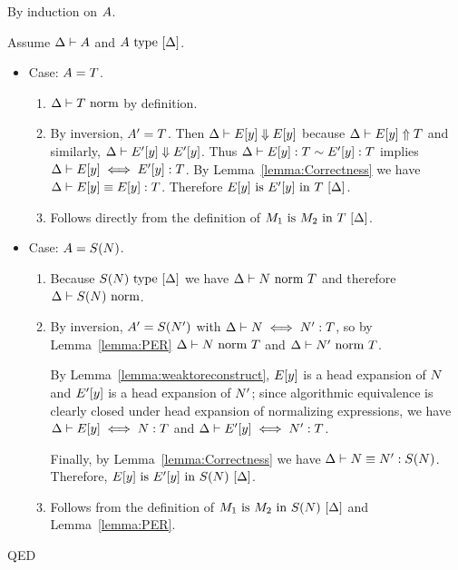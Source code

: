 \documentclass{article}
\theoremstyle{break}
\newcommand{\qed}{\mbox{QED}}
\newenvironment{proof}{\noindent{\bf Proof:}\hspace*{0.5em}}{\hspace*{\fill}\qed}
\begin{document}
\begin{proof}By induction on $A$.

Assume $\Delta\vdash A$ and ${A}\mathrm{\ type\ }[\Delta]$.
\begin{itemize}
\item Case: $A = T$.
\begin{enumerate}
\item ${\Delta}\vdash{T}\mbox{\ norm}$ by definition.
\item By inversion, $A' = T$.
Then $\Delta\vdash E[y] \Downarrow E[y]$ because
$\Delta\vdash E[y] \Uparrow T$ and similarly, 
$\Delta\vdash E'[y] \Downarrow E'[y]$.  
Thus $\Delta\vdash E[y] : T \sim E'[y] : T$
implies $\Delta\vdash E[y] \iff E'[y] : T$.
By Lemma~\ref{lemma:Correctness} we have
$\Delta\vdash E[y] \equiv E[y] : T$.
Therefore
${E[y]}\mathrm{\ is\ }{E'[y]}\mathrm{\ in\ }{T}\ [\Delta]$.
\item Follows directly from the definition of 
${M_1}\mathrm{\ is\ }{M_2}\mathrm{\ in\ }{T}\ [\Delta]$.
\end{enumerate}

\item Case: $A=S(N)$.
\begin{enumerate}
\item Because ${S(N)}\mathrm{\ type\ }[\Delta]$ we have
${\Delta}\vdash{N}\mbox{\ norm\ }{T}$ and therefore
${\Delta}\vdash{S(N)}\mbox{\ norm}$.
\item By inversion,
$A' = S(N')$ with
$\Delta\vdash N \iff N' : T$,
so by Lemma~\ref{lemma:PER} 
${\Delta}\vdash{N}\mbox{\ norm\ }{T}$ and
${\Delta}\vdash{N'}\mbox{\ norm\ }{T}$.

By Lemma~\ref{lemma:weaktoreconstruct},
$E[y]$ is a head expansion of $N$ and
$E'[y]$ is a head expansion of $N'$; since
algorithmic equivalence is clearly closed under
head expansion of normalizing expressions, we have
$\Delta\vdash E[y] \iff N : T$
and
$\Delta\vdash E'[y] \iff N' : T$.

Finally, by Lemma~\ref{lemma:Correctness} we have
$\Delta\vdash N \equiv N' : S(N)$.
Therefore, ${E[y]}\mathrm{\ is\ }{E'[y]}\mathrm{\ in\ }{S(N)}\ [\Delta]$.
\item Follows from the definition of 
${M_1}\mathrm{\ is\ }{M_2}\mathrm{\ in\ }{S(N)}\ [\Delta]$
and Lemma~\ref{lemma:PER}.
\end{enumerate}


\end{itemize}
\end{proof}
\end{document}
